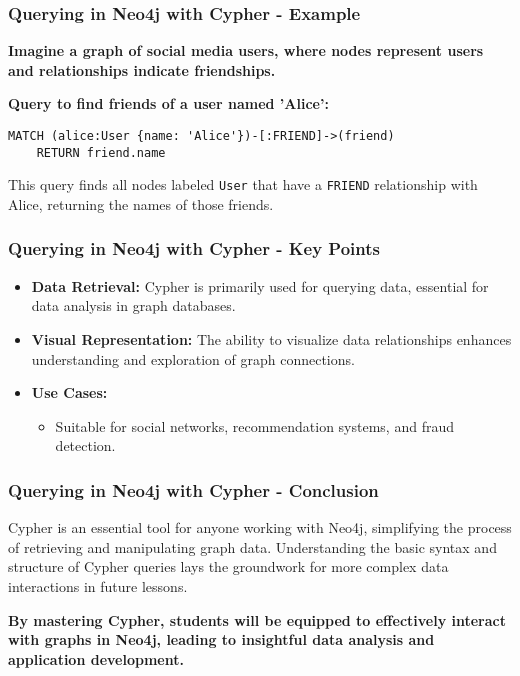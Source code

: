 \documentclass[aspectratio=169]{beamer}
\begin{document}
\begin{frame}[fragile]
    \frametitle{Querying in Neo4j with Cypher - Example}
    \textbf{Imagine a graph of social media users, where nodes represent users and relationships indicate friendships.}
    
    \textbf{Query to find friends of a user named 'Alice':}
    
    \begin{lstlisting}[language=cypher]
    MATCH (alice:User {name: 'Alice'})-[:FRIEND]->(friend)
    RETURN friend.name
    \end{lstlisting}
    
    This query finds all nodes labeled \texttt{User} that have a \texttt{FRIEND} relationship with Alice, returning the names of those friends.
\end{frame}

\begin{frame}[fragile]
    \frametitle{Querying in Neo4j with Cypher - Key Points}
    \begin{itemize}
        \item \textbf{Data Retrieval:} Cypher is primarily used for querying data, essential for data analysis in graph databases.
        \item \textbf{Visual Representation:} The ability to visualize data relationships enhances understanding and exploration of graph connections.
        \item \textbf{Use Cases:} 
            \begin{itemize}
                \item Suitable for social networks, recommendation systems, and fraud detection.
            \end{itemize}
    \end{itemize}
\end{frame}

\begin{frame}[fragile]
    \frametitle{Querying in Neo4j with Cypher - Conclusion}
    Cypher is an essential tool for anyone working with Neo4j, simplifying the process of retrieving and manipulating graph data. 
    Understanding the basic syntax and structure of Cypher queries lays the groundwork for more complex data interactions in future lessons.
    
    \textbf{By mastering Cypher, students will be equipped to effectively interact with graphs in Neo4j, leading to insightful data analysis and application development.}
\end{frame}
\end{document}
